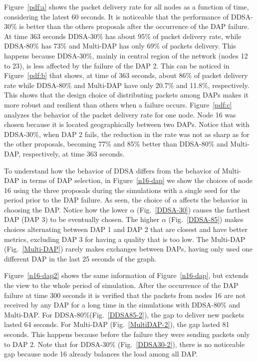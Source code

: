 \documentclass[conference]{IEEEtran}
\begin{document}
Figure~\ref{pdf:a} shows the packet delivery rate for all nodes as a function of time, considering the latest 60 seconds. It is noticeable that the performance of DDSA-30\% is better than the others proposals after the occurrence of the DAP failure. At time 363 seconds DDSA-30\% has about 95\% of packet delivery rate, while DDSA-80\% has 73\% and Multi-DAP has only 69\% of packets delivery. 
This happens because DDSA-30\%, mainly in central region of the network (nodes 12 to 23), is less affected by the failure of the DAP 2. This can be noticed in Figure~\ref{pdf:b} that shows, at time of 363 seconds, about 86\% of packet delivery rate while DDSA-80\% and Multi-DAP have only 20.7\% and 11.8\%, respectively. This shows that the design choice of distributing packets among DAPs makes it more robust and resilient than others when a failure occurs. 
Figure~\ref{pdf:c}  analyzes the behavior of the packet delivery rate for one node. Node 16 was chosen because it is located geographically between two DAPs. Notice that with DDSA-30\%, when DAP 2 fails, the reduction in the rate was not as sharp as for the other proposals, becoming 77\% and 85\% better than DDSA-80\% and Multi-DAP, respectively, at time 363 seconds. 



To understand how the behavior of DDSA differs from the behavior of Multi-DAP in terms of DAP selection, in Figure~\ref{n16-dap} we show the choices of node 16 using the three proposals during the simulations with a single seed for the period prior to the DAP failure. 
As seen, the choice of $\alpha$ affects the behavior in choosing the DAP. Notice how the lower $\alpha$ (Fig.~\ref{DDSA-30}) causes the farthest DAP (DAP 3) to be eventually chosen.
The higher $\alpha$ (Fig.~\ref{DDSA-85}) makes choices alternating between DAP 1 and DAP 2 that are closest and have better metrics, excluding DAP 3 for having a quality that is too low.
The Multi-DAP (Fig.~\ref{Multi-DAP}) rarely makes exchanges between DAPs, having only used one different DAP in the last 25 seconds of the graph.


Figure~\ref{n16-dap2} shows the same information of Figure~\ref{n16-dap}, but extends the view to the whole period of simulation. 
After the occurrence of the DAP failure at time 300 seconds it is verified that the packets from nodes 16 are not received by any DAP for a long time in the simulations with DDSA-80\% and Multi-DAP.
For DDSA-80\%(Fig.~\ref{DDSA85-2}), the gap to deliver new packets lasted 64 seconds. For Multi-DAP (Fig.~\ref{MultiDAP-2}), the gap lasted 81 seconds. This happens because before the failure they were sending packets only to DAP 2. Note that for DDSA-30\% (Fig.~\ref{DDSA30-2}), there is no noticeable gap because node 16 already balances the load among all DAP.
\end{document}

